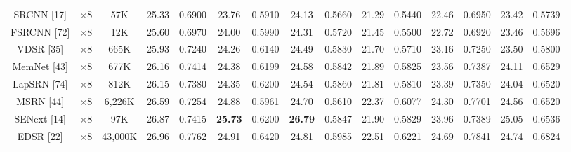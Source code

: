 \documentclass{ieeeaccess}
\begin{document}
\begin{table}
\begin{tabular}{|c|c|c|cc|cc|cc|cc|cc|cc|}
SRCNN [17] & $\times8$ &57K& \multicolumn{1}{c|}{25.33} & 0.6900 & \multicolumn{1}{c|}{23.76} &0.5910 &\multicolumn{1}{c|}{24.13} &0.5660 & \multicolumn{1}{c|}{21.29} &0.5440& \multicolumn{1}{c|}{22.46} &0.6950
&\multicolumn{1}{c|}{23.42} & 0.5739      \\

FSRCNN [72]& $\times8$&12K& \multicolumn{1}{c|}{25.60} &0.6970 & \multicolumn{1}{c|}{24.00} &0.5990&\multicolumn{1}{c|}{24.31} &0.5720 & \multicolumn{1}{c|}{21.45} &0.5500 & \multicolumn{1}{c|}{22.72} & 0.6920
&\multicolumn{1}{c|}{23.46} &  0.5696      \\

VDSR [35]& $\times8$&665K& \multicolumn{1}{c|}{25.93} &0.7240& \multicolumn{1}{c|}{24.26} &0.6140 &\multicolumn{1}{c|}{24.49} &0.5830 & \multicolumn{1}{c|}{21.70} &0.5710 & \multicolumn{1}{c|}{23.16} &0.7250
&\multicolumn{1}{c|}{23.50} & 0.5800       \\

MemNet [43]& $\times8$&677K& \multicolumn{1}{c|}{26.16} &  0.7414 & \multicolumn{1}{c|}{24.38} & 0.6199&\multicolumn{1}{c|}{24.58} & 0.5842 & \multicolumn{1}{c|}{21.89  } &0.5825 & \multicolumn{1}{c|}{23.56 } &0.7387
&\multicolumn{1}{c|}{24.11  } &  0.6529       \\

LapSRN [74]& $\times8$&812K& \multicolumn{1}{c|}{26.15} &0.7380& \multicolumn{1}{c|}{24.35} &0.6200 &\multicolumn{1}{c|}{24.54} &0.5860 & \multicolumn{1}{c|}{21.81} &0.5810 & \multicolumn{1}{c|}{23.39} &0.7350
&\multicolumn{1}{c|}{24.04} & 0.6520       \\

MSRN [44]& $\times8$&6,226K& \multicolumn{1}{c|}{26.59} &  0.7254 & \multicolumn{1}{c|}{24.88} & 0.5961&\multicolumn{1}{c|}{24.70} & 0.5610 & \multicolumn{1}{c|}{22.37 } & 0.6077 & \multicolumn{1}{c|}{24.30 } &0.7701
&\multicolumn{1}{c|}{24.56  } &  0.6520       \\

SENext [14] & $\times8$ &97K& \multicolumn{1}{c|}{26.87} &{0.7415} & \multicolumn{1}{c|}{\color{red}\textbf{25.73}} &{0.6200} & \multicolumn{1}{c|}{\color{red}\textbf{26.79}} &{0.5847} & \multicolumn{1}{c|}{21.90} &{0.5829} & \multicolumn{1}{c|}{23.96} &{0.7389} &\multicolumn{1}{c|}{25.05} &{0.6536}  \\


EDSR [22]& $\times8$&43,000K& \multicolumn{1}{c|}{26.96} &  0.7762 & \multicolumn{1}{c|}{24.91} & 0.6420&\multicolumn{1}{c|}{24.81} & 0.5985 & \multicolumn{1}{c|}{22.51  } &0.6221 & \multicolumn{1}{c|}{24.69 } &0.7841
&\multicolumn{1}{c|}{24.74  } &  0.6824       \\


\end{tabular}
\end{table}
\end{document}
